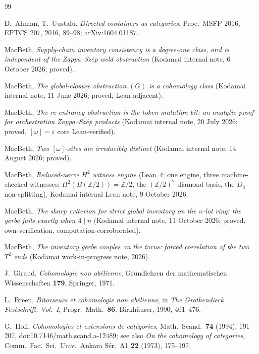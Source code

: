 \documentclass[11pt]{article}
\theoremstyle{definition}
\newcommand{\Z}{\mathbb{Z}}
\begin{document}
\begin{thebibliography}{99}

D.~Ahman, T.~Uustalu,
\emph{Directed containers as categories},
Proc.\ MSFP 2016, EPTCS 207, 2016, 89--98; arXiv:1604.01187.

MacBeth,
\emph{Supply-chain inventory consistency is a degree-one class, and is independent of the
Zappa--Sz\'ep weld obstruction}
(Kodamai internal note, 6 October 2026; proved).

MacBeth,
\emph{The global-closure obstruction $(G)$ is a cohomology class}
(Kodamai internal note, 11 June 2026; proved, Lean-adjacent).

MacBeth,
\emph{The re-entrancy obstruction is the token-mutation bit: an analytic proof for orchestration
Zappa--Sz\'ep products}
(Kodamai internal note, 20 July 2026; proved, $[\omega]=\varepsilon$ core Lean-verified).

MacBeth,
\emph{Two $[\omega]$-sites are irreducibly distinct}
(Kodamai internal note, 14 August 2026; proved).

MacBeth,
\emph{Reduced-nerve $H^2$ witness engine} (Lean~4; one engine, three machine-checked witnesses:
$H^2(B(\Z/2))=\Z/2$, the $(\Z/2)^2$ diamond basis, the $D_4$ non-splitting),
Kodamai internal Lean note, 9 October 2026.

MacBeth,
\emph{The sharp criterion for strict global inventory on the $n$-lot ring: the gerbe fails exactly
when $4\mid n$}
(Kodamai internal note, 11 October 2026; proved, own-verification, computation-corroborated).

MacBeth,
\emph{The inventory gerbe couples on the torus: forced correlation of the two $T^2$ ends}
(Kodamai work-in-progress note, 2026).

J.~Giraud,
\emph{Cohomologie non ab\'elienne},
Grundlehren der mathematischen Wissenschaften \textbf{179}, Springer, 1971.

L.~Breen,
\emph{Bitorseurs et cohomologie non ab\'elienne},
in \emph{The Grothendieck Festschrift, Vol.\ I}, Progr.\ Math.\ \textbf{86}, Birkh\"auser, 1990,
401--476.

G.~Hoff,
\emph{Cohomologies et extensions de cat\'egories},
Math.\ Scand.\ \textbf{74} (1994), 191--207, doi:10.7146/math.scand.a-12489; see also
\emph{On the cohomology of categories},
Comm.\ Fac.\ Sci.\ Univ.\ Ankara S\'er.\ A1 \textbf{22} (1973), 175--197.


\end{thebibliography}
\end{document}
